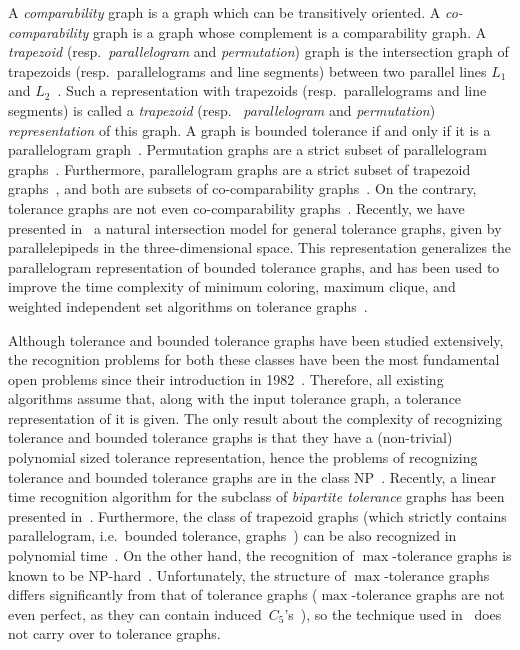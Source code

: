 \documentclass[proceedings]{stacs}
\begin{document}
A \emph{comparability} graph is a graph which can be transitively oriented.
A \emph{co-comparability} graph is a graph whose complement is a
comparability graph. A \emph{trapezoid} (resp.~\emph{parallelogram} and 
\emph{permutation}) graph is the intersection graph of trapezoids
(resp.~parallelograms and line segments) between two parallel lines $L_{1}$
and $L_{2}$~\cite{Golumbic04}. Such a representation with trapezoids
(resp.~parallelograms and line segments) is called a \emph{trapezoid} (resp.~%
\emph{parallelogram} and \emph{permutation}) \emph{representation} of this
graph. A graph is bounded tolerance if and only if it is a parallelogram
graph~\cite{Langley93,BFI95}. Permutation graphs are a strict subset of parallelogram
graphs~\cite{classes99}. Furthermore, parallelogram graphs are a strict
subset of trapezoid graphs~\cite{Ryan98}, and both are subsets of
co-comparability graphs~\cite{GolTol04,Golumbic04}. On the contrary,
tolerance graphs are not even co-comparability graphs~\cite{GolTol04,Golumbic04}. 
Recently, we have presented in~\cite{MSZ-Model-SIDMA-09} a natural
intersection model for general tolerance graphs, given by parallelepipeds in
the three-dimensional space. This representation generalizes the
parallelogram representation of bounded tolerance graphs, and has been used
to improve the time complexity of minimum coloring, maximum clique, and
weighted independent set algorithms on tolerance graphs~\cite{MSZ-Model-SIDMA-09}.

Although tolerance and bounded tolerance graphs have been studied
extensively, the recognition problems for both these classes have been
the most fundamental open problems since their introduction in 1982~\cite{GolTol04,Golumbic04,BuIs07}.
Therefore, all existing algorithms assume that, along with the input tolerance graph, a tolerance representation of it
is given. The only result about the complexity of recognizing tolerance and
bounded tolerance graphs is that they have a (non-trivial) polynomial sized tolerance
representation, hence the problems of recognizing tolerance and bounded tolerance graphs
 are in the class NP~\cite{HaSh04}. Recently, a linear time recognition algorithm 
for the subclass of \emph{bipartite tolerance} graphs has been presented in~\cite{BuIs07}. 
Furthermore, the class of trapezoid graphs (which strictly contains parallelogram, 
i.e.~bounded tolerance, graphs~\cite{Ryan98}) 
can be also recognized in polynomial time~\cite{MaSpinrad94,Spinrad03,MC-Trapezoid}. 
On the other hand, the recognition of $\max$-tolerance graphs is known to be NP-hard~\cite{KKL+06}.
Unfortunately, the structure of $\max$-tolerance graphs differs significantly from that of 
tolerance graphs ($\max$-tolerance graphs are not even perfect, as they can contain induced~$C_5$'s~\cite{KKL+06}), 
so the technique used in~\cite{KKL+06} does not carry over to tolerance graphs.
\end{document}
